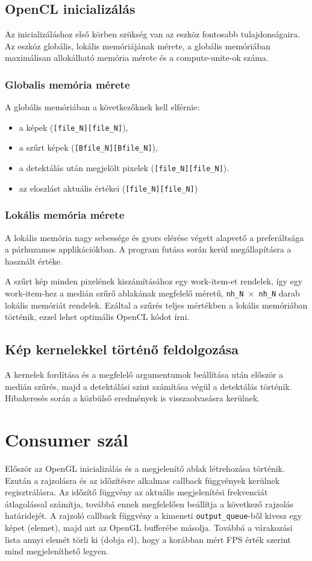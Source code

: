 	\subsection{OpenCL inicializálás}
	Az inicializáláshoz első körben szükség van az eszköz fontosabb tulajdonságaira. Az eszköz globális, lokális memóriájának mérete,
	a globális memóriában maximálisan allokálható memória mérete és a compute-unite-ok száma.
	\subsubsection{Globalis memória mérete}
	A globális memóriában a következőknek kell elférnie:
	\begin{itemize}[noitemsep]
	  \item a képek (\texttt{[file\_N][file\_N]}),
	  \item a szűrt képek (\texttt{[Bfile\_N][Bfile\_N]}),
	  \item a detektálás után megjelölt pixelek (\texttt{[file\_N][file\_N]}).
	  \item az eloszlást aktuális értékei (\texttt{[file\_N][file\_N]})
	\end{itemize}
	
	\subsubsection{Lokális memória mérete}
	A lokális memória nagy sebessége és gyors elérése végett alapvető a preferáltsága a párhuzamos applikációkban.
	A program futása során kerül megállapításra a használt értéke.
	
	A szűrt kép minden pixelének kiszámításához egy work-item-et rendelek, így egy work-item-hez a medián szűrő ablakának megfelelő
	méretű, \texttt{nh\_N $\times$ nh\_N} darab lokális memóriát rendelek. Ezáltal a szűrés teljes mértékben a lokális memóriában
	történik, ezzel lehet optimális OpenCL kódot írni.
	
	\subsection{Kép kernelekkel történő feldolgozása}
	A kernelek fordítása és a megfelelő argumentumok beállítása után először a medián szűrés, majd a detektálási szint számítása
	végül a detektálás történik. Hibakeresés során a közbülső eredmények is visszaolvasásra kerülnek.
	
	
\section{Consumer szál}
	Először az OpenGL inicializálás és a megjelenítő ablak létrehozása történik. 
	Ezután a rajzolásra és az időzítésre alkalmas callback függvények kerülnek regisztrálásra. Az időzítő függvény az aktuális
	megjelenítési frekvenciát átlagolással számítja, továbbá ennek megfelelően beállítja a következő rajzolás határidejét. A rajzoló
	callback függvény a kimeneti \texttt{output\_queue}-ből kivesz egy képet (elemet), majd azt az OpenGL bufferébe másolja. Továbbá
	a várakozási lista annyi elemét törli ki (dobja el), hogy a korábban mért FPS érték szerint mind megjeleníthető legyen.  
